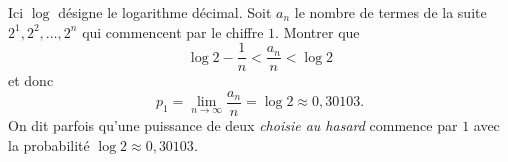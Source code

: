 Ici $\log$ désigne le logarithme décimal. Soit $a_n$ le nombre de termes de la suite $2^1, 2^2, \ldots, 2^n$ qui commencent par le chiffre $1$. Montrer que
\[ \log 2 - \frac{1}{n} < \frac{a_n}{n} < \log 2 \]
et donc
\[ p_1 = \lim_{n\to\infty} \frac{a_n}{n} = \log 2 \approx 0{,}30103. \]
On dit parfois qu'une puissance de deux \emph{choisie au hasard} commence par $1$ avec la probabilité $\log 2 \approx 0{,}30103$.
